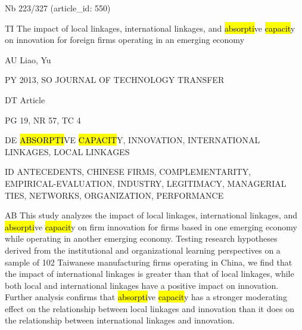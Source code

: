 \documentclass[a4paper]{article}
\begin{document}
\vspace*{-2cm}
Nb \tabto{0cm}223/327 (article\_id: 550)\par
TI \tabto{0cm}The impact of local linkages, international linkages, and \hl{absorpti}ve \hl{capacit}y on innovation for foreign firms operating in an emerging economy\par
AU \tabto{0cm}Liao, Yu\par
PY \tabto{0cm}2013, SO JOURNAL OF TECHNOLOGY TRANSFER\par
DT \tabto{0cm}Article\par
PG \tabto{0cm}19, NR 57, TC 4\par
DE \tabto{0cm}\hl{ABSORPTI}VE \hl{CAPACIT}Y, INNOVATION, INTERNATIONAL LINKAGES, LOCAL LINKAGES\par
ID \tabto{0cm}ANTECEDENTS, CHINESE FIRMS, COMPLEMENTARITY, EMPIRICAL-EVALUATION, INDUSTRY, LEGITIMACY, MANAGERIAL TIES, NETWORKS, ORGANIZATION, PERFORMANCE\par
AB \tabto{0cm}This study analyzes the impact of local linkages, international linkages, and \hl{absorpti}ve \hl{capacit}y on firm innovation for firms based in one emerging economy while operating in another emerging economy. Testing research hypotheses derived from the institutional and organizational learning perspectives on a sample of 102 Taiwanese manufacturing firms operating in China, we find that the impact of international linkages is greater than that of local linkages, while both local and international linkages have a positive impact on innovation. Further analysis confirms that \hl{absorpti}ve \hl{capacit}y has a stronger moderating effect on the relationship between local linkages and innovation than it does on the relationship between international linkages and innovation.\par
\clearpage
\end{document}

